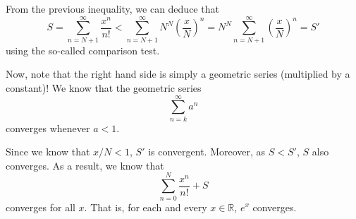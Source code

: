 \documentclass[12pt, a4paper]{article}
\begin{document}
From the previous inequality, we can deduce that
\[
  S = \sum_{n = N+1}^{\infty} \frac{x^n}{n!} < \sum_{n = N+1}^{\infty} N^N (\frac{x}{N})^n = N^N \sum_{n = N+1}^{\infty} (\frac{x}{N})^n = S'
\]
using the so-called comparison test.

Now, note that the right hand side is simply a geometric series (multiplied by a constant)! We know that the geometric series
\[
  \sum_{n = k}^{\infty} a^n
\]
converges whenever $a < 1$.

Since we know that $x/N < 1$, $S'$ is convergent. Moreover, as $S < S'$, $S$ also converges. As a result, we know that
\[
  \sum_{n = 0}^{N} \frac{x^n}{n!} + S
\]
converges for all $x$. That is, for each and every $x \in \mathbb{R}$, $e^x$ converges.
\end{document}
